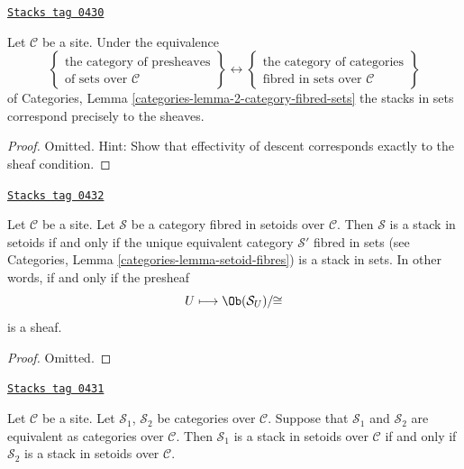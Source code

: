\begin{lemma}
\label{stacks-lemma-when-stack-in-sets}
\href{https://stacks.math.columbia.edu/tag/0430}{\texttt{Stacks tag 0430}}

Let $\mathcal{C}$ be a site. Under the equivalence
$$
\left\{
\begin{matrix}
\text{the category of presheaves}\\
\text{of sets over }\mathcal{C}
\end{matrix}
\right\}
\leftrightarrow
\left\{
\begin{matrix}
\text{the category of categories}\\
\text{fibred in sets over }\mathcal{C}
\end{matrix}
\right\}
$$
of
Categories, Lemma \ref{categories-lemma-2-category-fibred-sets}
the stacks in sets correspond precisely to the sheaves.
\end{lemma}

\begin{proof}
Omitted. Hint: Show that effectivity of descent corresponds exactly to
the sheaf condition.
\end{proof}

\begin{lemma}
\label{stacks-lemma-stack-in-setoids-characterize}
\href{https://stacks.math.columbia.edu/tag/0432}{\texttt{Stacks tag 0432}}

Let $\mathcal{C}$ be a site.
Let $\mathcal{S}$ be a category fibred in setoids over $\mathcal{C}$.
Then $\mathcal{S}$ is a stack in setoids if and only if the unique
equivalent category $\mathcal{S}'$ fibred in sets (see
Categories, Lemma \ref{categories-lemma-setoid-fibres})
is a stack in sets. In other words, if and only if the presheaf
$$
U \longmapsto \Ob(\mathcal{S}_U)/\!\!\cong
$$
is a sheaf.
\end{lemma}

\begin{proof}
Omitted.
\end{proof}

\begin{lemma}
\label{stacks-lemma-stack-in-setoids-equivalent}
\href{https://stacks.math.columbia.edu/tag/0431}{\texttt{Stacks tag 0431}}

Let $\mathcal{C}$ be a site.
Let $\mathcal{S}_1$, $\mathcal{S}_2$ be categories over $\mathcal{C}$.
Suppose that $\mathcal{S}_1$ and $\mathcal{S}_2$ are equivalent
as categories over $\mathcal{C}$.
Then $\mathcal{S}_1$ is a stack in setoids over $\mathcal{C}$ if and only if
$\mathcal{S}_2$ is a stack in setoids over $\mathcal{C}$.
\end{lemma}

